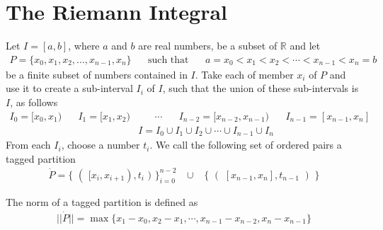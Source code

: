 \section{The Riemann Integral}

\begin{definition}
Let $I = [a, b]$, where $a$ and $b$ are real numbers, be a subset of $\mathbb{R}$ and let 
\begin{align*}
    P = \{x_{0}, x_{1}, x_{2}, ..., x_{n-1}, x_{n}\} \hspace{20pt} \text{such that} \hspace{20pt} a = x_{0} < x_{1} < x_{2} < \cdots < x_{n-1} < x_{n} = b
\end{align*}
be a finite subset of numbers contained in $I$. Take each of member $x_{i}$ of $P$ and use it to create a sub-interval $I_{i}$ of $I$, such that the union of these sub-intervals is $I$, as follows
\begin{align*}
    I_{0} = [x_{0}, x_{1}) \hspace{20pt} I_{1} = [x_{1}, x_{2})& \hspace{20pt} \cdots \hspace{20pt} I_{n-2} = [x_{n-2}, x_{n-1}) \hspace{20pt} I_{n-1} = [x_{n-1}, x_{n}]\\[2ex]
    &I = I_{0} \cup I_{1} \cup I_{2} \cup \cdots \cup I_{n-1} \cup I_{n}
\end{align*}
From each $I_{i}$, choose a number $t_{i}$. We call the following set of ordered pairs a tagged partition
\begin{align*}
    \dot P = \{ \hspace{4pt} ( \hspace{4pt} [x_{i}, x_{i+1}), t_{i} \hspace{4pt} ) \hspace{4pt}\}_{i = 0}^{n-2} \hspace{10pt} \cup \hspace{10pt} \{ \hspace{4pt} ( \hspace{4pt} [x_{n-1}, x_{n}], t_{n-1} \hspace{4pt} ) \hspace{4pt} \}
\end{align*}
\end{definition}

\begin{definition}
The norm of a tagged partition is defined as
\begin{align*}
    \lvert \lvert \dot P \rvert \rvert = \max \{x_{1} - x_{0}, x_{2} - x_{1}, \cdots , x_{n-1} - x_{n-2}, x_{n} - x_{n-1}\}
\end{align*}
\end{definition}

